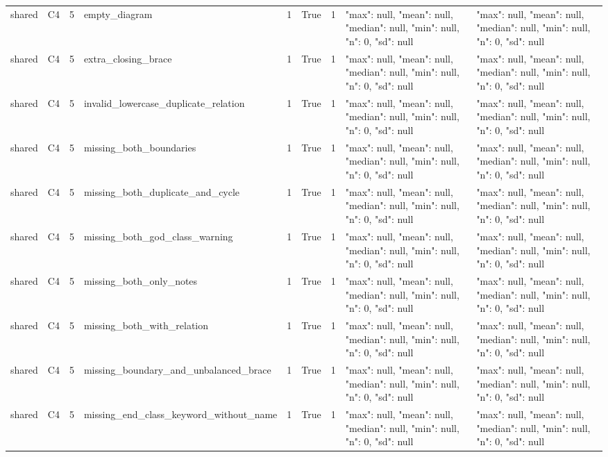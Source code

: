 \begin{tabular}{lllllllll}
shared & C4 & 5 & empty\_diagram & 1 & True & 1 & {"max": null, "mean": null, "median": null, "min": null, "n": 0, "sd": null} & {"max": null, "mean": null, "median": null, "min": null, "n": 0, "sd": null} \\
shared & C4 & 5 & extra\_closing\_brace & 1 & True & 1 & {"max": null, "mean": null, "median": null, "min": null, "n": 0, "sd": null} & {"max": null, "mean": null, "median": null, "min": null, "n": 0, "sd": null} \\
shared & C4 & 5 & invalid\_lowercase\_duplicate\_relation & 1 & True & 1 & {"max": null, "mean": null, "median": null, "min": null, "n": 0, "sd": null} & {"max": null, "mean": null, "median": null, "min": null, "n": 0, "sd": null} \\
shared & C4 & 5 & missing\_both\_boundaries & 1 & True & 1 & {"max": null, "mean": null, "median": null, "min": null, "n": 0, "sd": null} & {"max": null, "mean": null, "median": null, "min": null, "n": 0, "sd": null} \\
shared & C4 & 5 & missing\_both\_duplicate\_and\_cycle & 1 & True & 1 & {"max": null, "mean": null, "median": null, "min": null, "n": 0, "sd": null} & {"max": null, "mean": null, "median": null, "min": null, "n": 0, "sd": null} \\
shared & C4 & 5 & missing\_both\_god\_class\_warning & 1 & True & 1 & {"max": null, "mean": null, "median": null, "min": null, "n": 0, "sd": null} & {"max": null, "mean": null, "median": null, "min": null, "n": 0, "sd": null} \\
shared & C4 & 5 & missing\_both\_only\_notes & 1 & True & 1 & {"max": null, "mean": null, "median": null, "min": null, "n": 0, "sd": null} & {"max": null, "mean": null, "median": null, "min": null, "n": 0, "sd": null} \\
shared & C4 & 5 & missing\_both\_with\_relation & 1 & True & 1 & {"max": null, "mean": null, "median": null, "min": null, "n": 0, "sd": null} & {"max": null, "mean": null, "median": null, "min": null, "n": 0, "sd": null} \\
shared & C4 & 5 & missing\_boundary\_and\_unbalanced\_brace & 1 & True & 1 & {"max": null, "mean": null, "median": null, "min": null, "n": 0, "sd": null} & {"max": null, "mean": null, "median": null, "min": null, "n": 0, "sd": null} \\
shared & C4 & 5 & missing\_end\_class\_keyword\_without\_name & 1 & True & 1 & {"max": null, "mean": null, "median": null, "min": null, "n": 0, "sd": null} & {"max": null, "mean": null, "median": null, "min": null, "n": 0, "sd": null} \\

\end{tabular}
